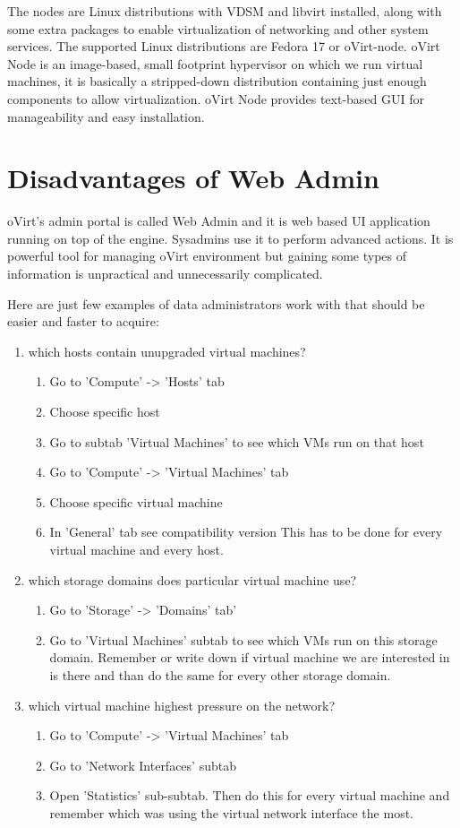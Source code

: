 The nodes are Linux distributions with VDSM and libvirt installed, along with some extra packages to enable virtualization of networking and other system services. The supported Linux distributions are Fedora 17 or oVirt-node. oVirt Node is an image-based, small footprint hypervisor on which we run virtual machines, it is basically a stripped-down distribution containing just enough components to allow virtualization. oVirt Node provides text-based GUI for manageability and easy installation.

\section{Disadvantages of Web Admin}
oVirt's admin portal is called Web Admin and it is web based UI application running on top of the engine. Sysadmins use it to perform advanced actions. It is powerful tool for managing oVirt environment but gaining some types of information is unpractical and unnecessarily complicated.

Here are just few examples of data administrators work with that should be easier and faster to acquire:
\begin{enumerate}
\item which hosts contain unupgraded virtual machines?
\begin{enumerate}
\item Go to 'Compute' -> 'Hosts' tab
\item Choose specific host
\item Go to subtab 'Virtual Machines' to see which VMs run on that host
\item Go to 'Compute' -> 'Virtual Machines' tab
\item Choose specific virtual machine
\item In 'General' tab see compatibility version
This has to be done for every virtual machine and every host.
\end{enumerate}
\item which storage domains does particular virtual machine use?
\begin{enumerate}
\item Go to 'Storage' -> 'Domains' tab'
\item Go to 'Virtual Machines' subtab to see which VMs run on this storage domain. Remember or write down if virtual machine we are interested in is there and than do the same for every other storage domain.
\end{enumerate}
\item which virtual machine highest pressure on the network?
\begin{enumerate}
\item Go to 'Compute' -> 'Virtual Machines' tab
\item Go to 'Network Interfaces' subtab
\item Open 'Statistics' sub-subtab. Then do this for every virtual machine and remember which was using the virtual network interface the most.
\end{enumerate}
\end{enumerate}

